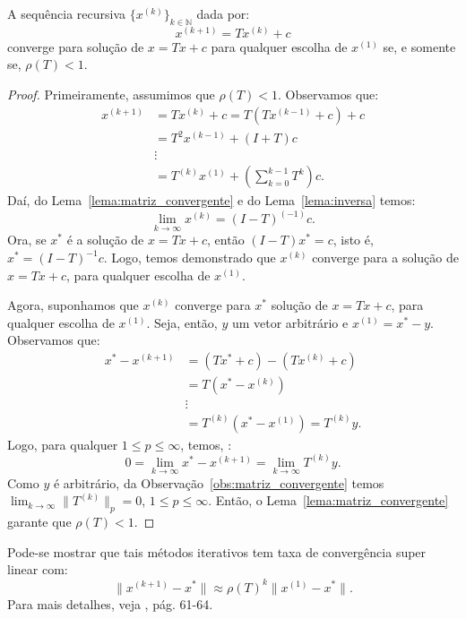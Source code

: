 \begin{teo}\label{teo:convergencia}
  A sequência recursiva $\{x^{(k)}\}_{k\in\mathbb{N}}$ dada por:
  \begin{equation*}
    x^{(k+1)} = Tx^{(k)} + c
  \end{equation*}
converge para solução de $x = Tx + c$ para qualquer escolha de $x^{(1)}$ se, e somente se, $\rho(T) < 1$.
\end{teo}
\begin{proof}
  Primeiramente, assumimos que $\rho(T) < 1$. Observamos que:
  \begin{eqnarray*}
    x^{(k+1)} &= Tx^{(k)} + c = T(Tx^{(k-1)} + c) + c \\
    &= T^2x^{(k-1)} + (I + T)c \\
    &\vdots\\
    &= T^{(k)}x^{(1)} + \left(\sum_{k=0}^{k-1}T^k\right)c.
  \end{eqnarray*}
Daí, do Lema~\ref{lema:matriz_convergente} e do Lema~\ref{lema:inversa} temos:
\begin{equation*}
  \lim_{k\to\infty} x^{(k)} = (I - T)^{(-1)}c.
\end{equation*}
Ora, se $x^*$ é a solução de $x = Tx + c$, então $(I - T)x^* = c$, isto é, $x^* = (I - T)^{-1}c$. Logo, temos demonstrado que $x^{(k)}$ converge para a solução de  $x = Tx + c$, para qualquer escolha de $x^{(1)}$.

Agora, suponhamos que $x^{(k)}$ converge para $x^*$ solução de $x = Tx + c$, para qualquer escolha de $x^{(1)}$. Seja, então, $y$ um vetor arbitrário e $x^{(1)} = x^* - y$. Observamos que:
\begin{eqnarray*}
  x^* - x^{(k+1)} &= (Tx^* + c) - (Tx^{(k)} + c) \\
  &= T(x^* - x^{(k)})\\
  &\vdots\\
  &= T^{(k)}(x^* - x^{(1)}) = T^{(k)}y.
\end{eqnarray*}
Logo, para qualquer $1 \leq p \leq\infty$, temos, :
\begin{equation*}
  0 = \lim_{k\to\infty} x^* - x^{(k+1)} = \lim_{k\to\infty} T^{(k)}y.
\end{equation*}
Como $y$ é arbitrário, da Observação~\ref{obs:matriz_convergente} temos $\displaystyle\lim_{k\to\infty} \|T^{(k)}\|_p = 0$, $1 \leq p \leq \infty$. Então, o Lema~\ref{lema:matriz_convergente} garante que $\rho(T) < 1$.
\end{proof}

\begin{obs}
  Pode-se mostrar que tais métodos iterativos tem taxa de convergência super linear com:
  \begin{equation*}
    \|x^{(k+1)} - x^*\| \approx \rho(T)^{k}\|x^{(1)} - x^*\|.
  \end{equation*}
Para mais detalhes, veja \cite{Isaacson1994a}, pág. 61-64.
\end{obs}

